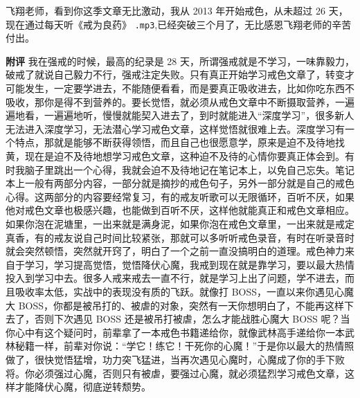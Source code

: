 \begin{case}
    飞翔老师，看到你这季文章无比激动，我从 2013 年开始戒色，从未超过 26 天，现在通过每天听《戒为良药》 \texttt{.mp3},已经突破三个月了，无比感恩飞翔老师的辛苦付出。

    \textbf{附评} 我在强戒的时候，最高的纪录是 28 天，所谓强戒就是不学习，一味靠毅力，破戒了就说自己毅力不行，强戒注定失败。只有真正开始学习戒色文章了，转变才可能发生，一定要学进去，不能随便看看，而是要真正吸收进去，比如你吃东西不吸收，那你是得不到营养的。要长觉悟，就必须从戒色文章中不断摄取营养，一遍遍地看，一遍遍地听，慢慢就能契入进去了，到时就能进入“深度学习”，很多新人无法进入深度学习，无法潜心学习戒色文章，这样觉悟就很难上去。深度学习有一个特点，那就是能够不断获得领悟，而且自己也很愿意学，原来是迫不及待地找黄，现在是迫不及待地想学习戒色文章，这种迫不及待的心情你要真正体会到。有时我脑子里跳出一个心得，我就会迫不及待地记在笔记本上，以免自己忘失。笔记本上一般有两部分内容，一部分就是摘抄的戒色句子，另外一部分就是自己的戒色心得。这两部分的内容要经常复习，有的戒友听歌可以无限循环，百听不厌，如果他对戒色文章也极感兴趣，也能做到百听不厌，这样他就能真正和戒色文章相应。如果你泡在泥塘里，一出来就是满身泥，如果你泡在戒色文章里，一出来就是戒定真香，有的戒友说自己时间比较紧张，那就可以多听听戒色录音，有时在听录音时就会突然顿悟，突然就开窍了，明白了一个之前一直没搞明白的道理。戒色神力来自于学习，学习提高觉悟，觉悟降伏心魔，我戒到现在就是靠学习，要以最大热情投入到学习中去。很多人戒来戒去一直不行，就是学习上出了问题，学不进去，而且吸收率太低，实战中的表现没有质的飞跃。就像打 BOSS，一直以来你遇见心魔大 BOSS，你都是被吊打的、被虐的对象，突然有一天你想明白了，不能再这样下去了，否则下次遇见 BOSS 还是被吊打被虐，怎么才能战胜心魔大 BOSS 呢？当你心中有这个疑问时，前辈拿了一本戒色书籍递给你，就像武林高手递给你一本武林秘籍一样，前辈对你说：“学它！练它！干死你的心魔！”于是你以最大的热情照做了，很快觉悟猛增，功力突飞猛进，当再次遇见心魔时，心魔成了你的手下败将。你必须强过心魔，否则只有被虐，要强过心魔，就必须猛烈学习戒色文章，这样才能降伏心魔，彻底逆转颓势。
\end{case}

